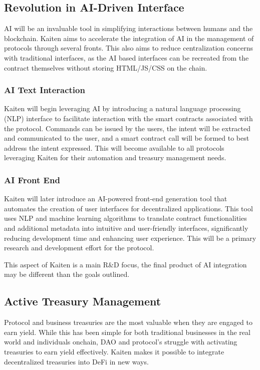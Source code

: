 \documentclass[11pt,oneside,a4paper]{article}
\begin{document}
\subsection{Revolution in AI-Driven Interface}

AI will be an invaluable tool in simplifying interactions between humans and the blockchain. Kaiten aims to accelerate the integration of AI in the management of protocols through several fronts. This also aims to reduce centralization concerns with traditional interfaces, as the AI based interfaces can be recreated from the contract themselves without storing HTML/JS/CSS on the chain.

\subsubsection{AI Text Interaction}
Kaiten will begin leveraging AI by introducing a natural language processing (NLP) interface to facilitate interaction with the smart contracts associated with the protocol. Commands can be issued by the users, the intent will be extracted and communicated to the user, and a smart contract call will be formed to best address the intent expressed. This will become available to all protocols leveraging Kaiten for their automation and treasury management needs.

\subsubsection{AI Front End}
Kaiten will later introduce an AI-powered front-end generation tool that automates the creation of user interfaces for decentralized applications. This tool uses NLP and machine learning algorithms to translate contract functionalities and additional metadata into intuitive and user-friendly interfaces, significantly reducing development time and enhancing user experience. This will be a primary research and development effort for the protocol.

 This aspect of Kaiten is a main R\&D focus, the final product of AI integration may be different than the goals outlined.

\subsection{Active Treasury Management}

Protocol and business treasuries are the most valuable when they are engaged to earn yield. While this has been simple for both traditional businesses in the real world and individuals onchain, DAO and protocol’s struggle with activating treasuries to earn yield effectively. Kaiten makes it possible to integrate decentralized treasuries into DeFi in new ways.
\end{document}
